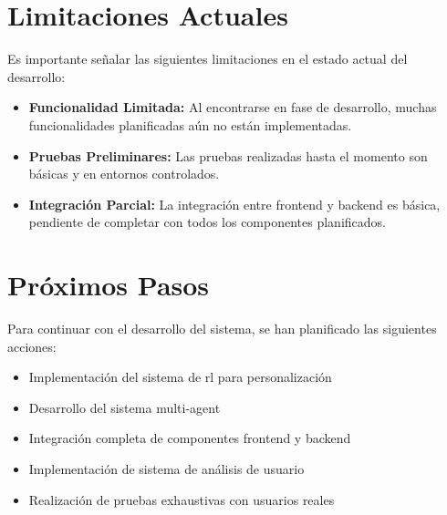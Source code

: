 \section{Limitaciones Actuales}
\label{limitaciones-actuales}

Es importante señalar las siguientes limitaciones en el estado actual del desarrollo:

\begin{itemize}
    \item \textbf{Funcionalidad Limitada:} Al encontrarse en fase de desarrollo, muchas funcionalidades planificadas aún no están implementadas.
    
    \item \textbf{Pruebas Preliminares:} Las pruebas realizadas hasta el momento son básicas y en entornos controlados.
    
    \item \textbf{Integración Parcial:} La integración entre frontend y backend es básica, pendiente de completar con todos los componentes planificados.
\end{itemize}

\section{Próximos Pasos}
\label{proximos-pasos}

Para continuar con el desarrollo del sistema, se han planificado las siguientes acciones:

\begin{itemize}
    \item Implementación del sistema de \gls{rl} para personalización
    \item Desarrollo del sistema \gls{multi-agent}
    \item Integración completa de componentes frontend y backend
    \item Implementación de sistema de análisis de usuario
    \item Realización de pruebas exhaustivas con usuarios reales
\end{itemize}